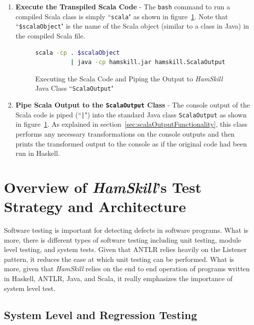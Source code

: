 \documentclass{report}
\begin{document}
\begin{enumerate}
\item \textbf{Execute the Transpiled Scala Code} - The \texttt{bash} command to run a compiled Scala class is simply ``\texttt{scala}" as shown in figure~\ref{fig:runScalaAndConvertOutput}.  Note that ``\texttt{\$scalaObject}" is the name of the Scala object (similar to a class in Java) in the compiled Scala file.

\begin{figure}[H]
\begin{mdframed}
\begin{lstlisting}[language=bash]
scala -cp . $scalaObject 
          | java -cp hamskill.jar hamskill.ScalaOutput
\end{lstlisting}
\end{mdframed}
\caption{Executing the Scala Code and Piping the Output to \textit{HamSkill} Java Class ``\texttt{ScalaOutput}"}\label{fig:runScalaAndConvertOutput}
\end{figure}

\item \textbf{Pipe Scala Output to the \texttt{ScalaOutput} Class} - The console output of the Scala code is piped (``\texttt{|}") into the standard Java class \texttt{ScalaOutput} as shown in figure~\ref{fig:runScalaAndConvertOutput}.  As explained in section~\ref{sec:scalaOutputFunctionality}, this class performs any necessary transformations on the console outputs and then prints the transformed output to the console as if the original code had been run in Haskell.

\end{enumerate} 


\section{Overview of \textit{HamSkill}'s Test Strategy and Architecture}

Software testing is important for detecting defects in software programs.  What is more, there is different types of software testing including unit testing, module level testing, and system tests.  Given that ANTLR relies heavily on the Listener pattern, it reduces the ease at which unit testing can be performed.  What is more, given that \textit{HamSkill} relies on the end to end operation of programs written in Haskell, ANTLR, Java, and Scala, it really emphasizes the importance of system level test.

\subsection{System Level and Regression Testing}
\end{document}
